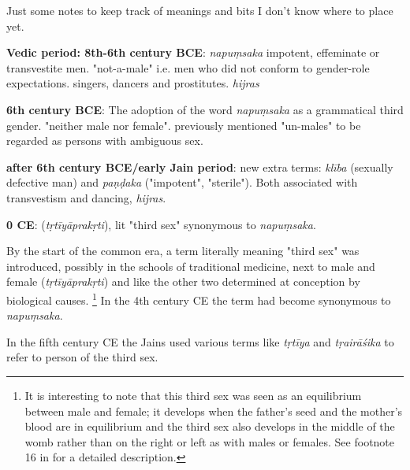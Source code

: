 Just some notes to keep track of meanings and bits I don't know where to place yet.

\textbf{Vedic period: 8th-6th century BCE}: {\em napuṃsaka} impotent, effeminate or transvestite men. "not-a-male" i.e. men who did not conform to gender-role expectations. singers, dancers and prostitutes. {\em hijras}

\textbf{6th century BCE}: The adoption of the word {\em napuṃsaka} as a grammatical third gender. "neither male nor female". previously mentioned "un-males" to be regarded as persons with ambiguous sex.

\textbf{after 6th century BCE/early Jain period}: new extra terms: {\em klība} (sexually defective man) and {\em paṇḍaka} ("impotent", "sterile"). Both associated with transvestism and dancing, {\em hijras}.

\textbf{0 CE}: ({\em tṛtīyāprakṛti}), lit "third sex" synonymous to {\em napuṃsaka}.


By the start of the common era, a term literally meaning "third sex" was introduced, possibly in the schools of traditional medicine, next to male and female ({\em tṛtīyāprakṛti}) and like the other two determined at conception by biological causes. \footnote{It is interesting to note that this third sex was seen as an equilibrium between male and female; it develops when the father's seed and the mother's blood are in equilibrium and the third sex also develops in the middle of the womb rather than on the right or left as with males or females. See footnote 16 in \cite{zwilling} for a detailed description.} In the 4th century CE the term had become synonymous to {\em napuṃsaka}.

In the fifth century CE the Jains used various terms like {\em tṛtīya} and {\em tṛairāśika} to refer to person of the third sex. 